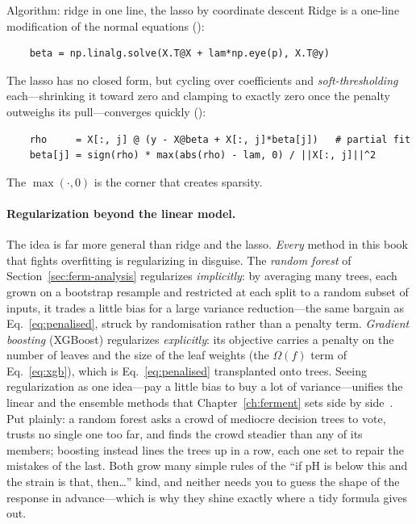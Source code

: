 \begin{keybox}{Algorithm: ridge in one line, the lasso by coordinate descent}
Ridge is a one-line modification of the normal equations
():
\begin{verbatim}
    beta = np.linalg.solve(X.T@X + lam*np.eye(p), X.T@y)
\end{verbatim}
The lasso has no closed form, but cycling over coefficients and
\emph{soft-thresholding} each---shrinking it toward zero and clamping to exactly
zero once the penalty outweighs its pull---converges quickly
():
\begin{verbatim}
    rho     = X[:, j] @ (y - X@beta + X[:, j]*beta[j])   # partial fit
    beta[j] = sign(rho) * max(abs(rho) - lam, 0) / ||X[:, j]||^2
\end{verbatim}
The $\max(\cdot,0)$ is the corner that creates sparsity.
\end{keybox}

\paragraph{Regularization beyond the linear model.}
The idea is far more general than ridge and the lasso. \emph{Every} method in
this book that fights overfitting is regularizing in disguise. The
\emph{random forest} of Section~\ref{sec:ferm-analysis} regularizes
\emph{implicitly}: by averaging many trees, each grown on a bootstrap resample
and restricted at each split to a random subset of inputs, it trades a little
bias for a large variance reduction---the same bargain as
Eq.~\eqref{eq:penalised}, struck by randomisation rather than a penalty term.
\emph{Gradient boosting} (XGBoost) regularizes \emph{explicitly}: its objective
carries a penalty on the number of leaves and the size of the leaf weights
(the $\Omega(f)$ term of Eq.~\eqref{eq:xgb}), which is Eq.~\eqref{eq:penalised}
transplanted onto trees. Seeing regularization as one idea---pay a little bias to
buy a lot of variance---unifies the linear and the ensemble methods that
Chapter~\ref{ch:ferment} sets side by side~\cite{esl}. Put plainly: a random
forest asks a crowd of mediocre decision trees to vote, trusts no single one too
far, and finds the crowd steadier than any of its members; boosting instead lines
the trees up in a row, each one set to repair the mistakes of the last. Both grow
many simple rules of the ``if pH is below this and the strain is that, then\dots''
kind, and neither needs you to guess the shape of the response in advance---which
is why they shine exactly where a tidy formula gives out.

